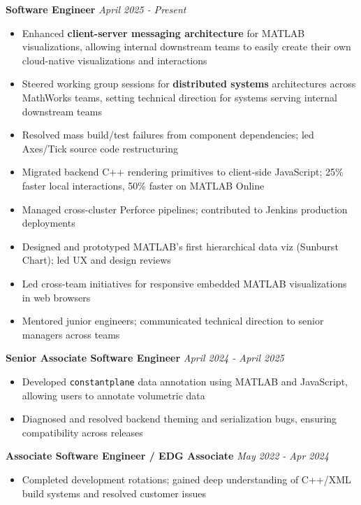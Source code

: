 \documentclass{article}
\begin{document}
{\large \textbf{Software Engineer}} \hfill \textit{April 2025 - Present}
\begin{itemize}[leftmargin=*]
    \item Enhanced \textbf{client-server messaging architecture} for MATLAB visualizations, allowing internal downstream teams to easily create their own cloud-native visualizations and interactions
    \item Steered working group sessions for \textbf{distributed systems} architectures across MathWorks teams, setting technical direction for systems serving internal downstream teams
    \item Resolved mass build/test failures from component dependencies; led Axes/Tick source code restructuring
    \item Migrated backend C++ rendering primitives to client-side JavaScript; 25\% faster local interactions, 50\% faster on MATLAB Online
    \item Managed cross-cluster Perforce pipelines; contributed to Jenkins production deployments
    \item Designed and prototyped MATLAB's first hierarchical data viz (Sunburst Chart); led UX and design reviews
    \item Led cross-team initiatives for responsive embedded MATLAB visualizations in web browsers
    \item Mentored junior engineers; communicated technical direction to senior managers across teams
\end{itemize}

{\large \textbf{Senior Associate Software Engineer}} \hfill \textit{April 2024 - April 2025}
\begin{itemize}[leftmargin=*]
    \item Developed \texttt{constantplane} data annotation using MATLAB and JavaScript, allowing users to annotate volumetric data
    \item Diagnosed and resolved backend theming and serialization bugs, ensuring compatibility across releases
\end{itemize}

{\large \textbf{Associate Software Engineer / EDG Associate}} \hfill \textit{May 2022 - Apr 2024}
\begin{itemize}[leftmargin=*]
    \item Completed development rotations; gained deep understanding of C++/XML build systems and resolved customer issues
\end{itemize}
\end{document}
